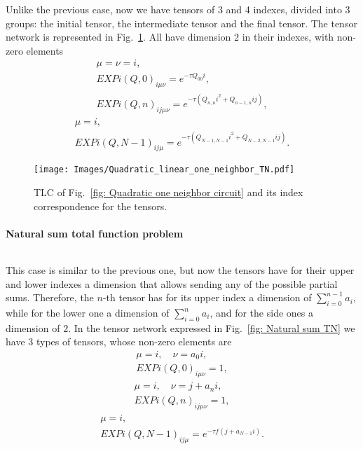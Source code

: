 Unlike the previous case, now we have tensors of 3 and 4 indexes, divided into 3 groups: the initial tensor, the intermediate tensor and the final tensor. The tensor network is represented in Fig.~\ref{fig: Quadratic TN}. All have dimension $2$ in their indexes, with non-zero elements
\begin{equation}
    \begin{gathered}
        \mu=\nu=i,\\
        EXPi(Q,0)_{i\mu\nu}=e^{-\tau Q_{00}i},\\
        EXPi(Q,n)_{ij\mu\nu}=e^{-\tau (Q_{n,n}i^2+Q_{n-1,n}ij)},
    \end{gathered}
\end{equation}
\begin{equation}
    \begin{gathered}
        \mu=i,\\
        EXPi(Q,N-1)_{ij\mu}=e^{-\tau (Q_{N-1,N-1}i^2+Q_{N-2,N-1}ij)}.
    \end{gathered}
\end{equation}
\begin{figure}
    \centering
    \texttt{[image: Images/Quadratic\_linear\_one\_neighbor\_TN.pdf]}
    \caption{TLC of Fig.~\ref{fig: Quadratic one neighbor circuit} and its index correspondence for the tensors.}
    \label{fig: Quadratic TN}
\end{figure}


\paragraph{Natural sum total function problem}
$ $

This case is similar to the previous one, but now the tensors have for their upper and lower indexes a dimension that allows sending any of the possible partial sums. Therefore, the $n$-th tensor has for its upper index a dimension of $\sum_{i=0}^{n-1}a_i$, while for the lower one a dimension of $\sum_{i=0}^{n}a_i$, and for the side ones a dimension of $2$. In the tensor network expressed in Fig.~\ref{fig: Natural sum TN} we have 3 types of tensors, whose non-zero elements are
\begin{equation}
    \begin{gathered}
        \mu=i,\quad \nu=a_0 i,\\
        EXPi(Q,0)_{i\mu\nu}=1,
    \end{gathered}
\end{equation}
\begin{equation}
    \begin{gathered}
        \mu=i,\quad \nu=j+a_n i,\\
        EXPi(Q,n)_{ij\mu\nu}=1,
    \end{gathered}
\end{equation}
\begin{equation}
    \begin{gathered}
        \mu=i,\\
        EXPi(Q,N-1)_{ij\mu}=e^{-\tau f(j+a_{N-1}i)}.
    \end{gathered}
\end{equation}

